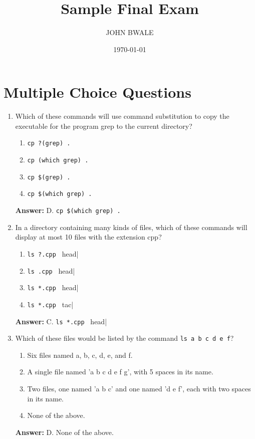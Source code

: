 \documentclass{article}
\begin{document}
\title{Sample Final Exam}
\author{JOHN BWALE}
\date{\today}
\maketitle

\section{Multiple Choice Questions}

\begin{enumerate}
    \item Which of these commands will use command substitution to copy the executable for the program grep to the current directory?
    \begin{enumerate}
        \item \verb|cp ?(grep) .|
        \item \verb|cp (which grep) .|
        \item \verb|cp $(grep) .|
        \item \verb|cp $(which grep) .|
    \end{enumerate}
    \textbf{Answer:} D. \verb|cp $(which grep) .|

    \item In a directory containing many kinds of files, which of these commands will display at most 10 files with the extension cpp?
    \begin{enumerate}
        \item \verb|ls ?.cpp | head|
        \item \verb|ls .cpp | head|
        \item \verb|ls *.cpp | head|
        \item \verb|ls *.cpp | tac|
    \end{enumerate}
    \textbf{Answer:} C. \verb|ls *.cpp | head|

    \item Which of these files would be listed by the command \verb|ls a b c d e f|?
    \begin{enumerate}
        \item Six files named a, b, c, d, e, and f.
        \item A single file named 'a b c d e f g', with 5 spaces in its name.
        \item Two files, one named 'a b c' and one named 'd e f', each with two spaces in its name.
        \item None of the above.
    \end{enumerate}
    \textbf{Answer:} D. None of the above.


\end{enumerate}
\end{document}
